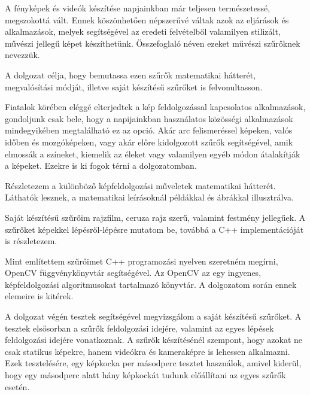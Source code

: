 

A fényképek és videók készítése napjainkban már teljesen természetessé, megszokottá vált. Ennek köszönhetően népszerűvé váltak azok az eljárások és alkalmazások, melyek segítségével az eredeti felvételből valamilyen stilizált, művészi jellegű képet készíthetünk. Összefoglaló néven ezeket művészi szűrőknek nevezzük.

A dolgozat célja, hogy bemutassa ezen szűrők matematikai hátterét, megvalósítási módját, illetve saját készítésű szűrőket is felvonultasson.

Fiatalok körében eléggé elterjedtek a kép feldolgozással kapcsolatos alkalmazások, gondoljunk csak bele, hogy a napijainkban használatos közösségi alkalmazások mindegyikében megtalálható ez az opció. Akár arc felismeréssel képeken, valós időben és mozgóképeken, vagy akár előre kidolgozott szűrők segítségével, amik elmossák a színeket, kiemelik az éleket vagy valamilyen egyéb módon átalakítják a képeket. Ezekre is ki fogok térni a dolgozatomban.

Részletezem a különböző képfeldolgozási műveletek matematikai hátterét. Láthatók lesznek, a matematikai leírásoknál példákkal és ábrákkal illusztrálva.

Saját készítésű szűrőim rajzfilm, ceruza rajz szerű, valamint festmény jellegűek. A szűrőket képekkel lépésről-lépésre mutatom be, továbbá a C++ implementációját is részletezem.

Mint említettem szűrőimet C++ programozási nyelven szeretném megírni, OpenCV függvénykönyvtár segítségével. Az OpenCV az egy ingyenes, képfeldolgozási algoritmusokat tartalmazó könyvtár. A dolgozatom során ennek elemeire is kitérek.

A dolgozat végén tesztek segítségével megvizsgálom a saját készítésű szűrőket. A tesztek elsősorban a szűrők feldolgozási idejére, valamint az egyes lépések feldolgozási idejére vonatkoznak. A szűrők készítésénél szempont, hogy azokat ne csak statikus képekre, hanem videókra és kameraképre is lehessen alkalmazni. Ezek tesztelésére, egy képkocka per másodperc tesztet használok, amivel kiderül, hogy egy másodperc alatt hány képkockát tudunk előállítani az egyes szűrők esetén.
